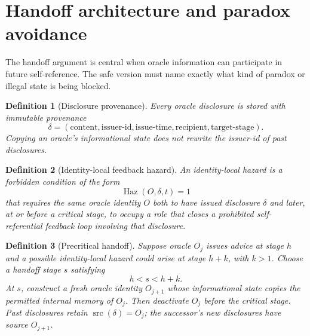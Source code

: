 \documentclass[11pt]{article}
\newtheorem{definition}{Definition}[section]
\theoremstyle{remark}
\newcommand{\src}{\operatorname{src}}
\newcommand{\Haz}{\operatorname{Haz}}
\begin{document}
\section{Handoff architecture and paradox avoidance}

The handoff argument is central when oracle information can participate in future self-reference. The safe version must name exactly what kind of paradox or illegal state is being blocked.

\begin{definition}[Disclosure provenance]
Every oracle disclosure is stored with immutable provenance
\[
\delta=(\text{content},\text{issuer-id},\text{issue-time},\text{recipient},\text{target-stage}).
\]
Copying an oracle's informational state does not rewrite the issuer-id of past disclosures.
\end{definition}

\begin{definition}[Identity-local feedback hazard]
An identity-local hazard is a forbidden condition of the form
\[
\Haz(O,\delta,t)=1
\]
that requires the same oracle identity $O$ both to have issued disclosure $\delta$ and later, at or before a critical stage, to occupy a role that closes a prohibited self-referential feedback loop involving that disclosure.
\end{definition}

\begin{definition}[Precritical handoff]
Suppose oracle $O_j$ issues advice at stage $h$ and a possible identity-local hazard could arise at stage $h+k$, with $k>1$. Choose a handoff stage $s$ satisfying
\[
h<s<h+k.
\]
At $s$, construct a fresh oracle identity $O_{j+1}$ whose informational state copies the permitted internal memory of $O_j$. Then deactivate $O_j$ before the critical stage. Past disclosures retain $\src(\delta)=O_j$; the successor's new disclosures have source $O_{j+1}$.
\end{definition}
\end{document}
